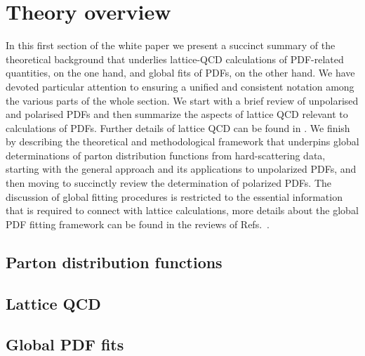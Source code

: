 
\section{Theory overview}
\label{sec:theoryoverview}

In this first section of the white paper we present a succinct
summary of the theoretical background that underlies
lattice-QCD calculations of PDF-related
quantities, on the one hand, and global fits
of PDFs, on the other hand.
%
We have devoted particular attention to ensuring a unified and
consistent notation among the various parts of the whole section. We start with a brief
review of unpolarised and polarised PDFs and then summarize the aspects of lattice
QCD relevant to calculations of PDFs. Further details of lattice QCD can be found in
\cite{???}. We finish by describing the theoretical and methodological framework that underpins global
determinations of parton distribution functions from hard-scattering data, starting with
the general approach and its applications to unpolarized PDFs, and then
moving to succinctly review the determination of polarized PDFs.
%
The discussion of global fitting procedures is restricted to the essential information that is required to connect
with lattice calculations, more details about the
global PDF fitting framework can be found in the reviews of
Refs.~\cite{Ball:2012wy,Forte:2013wc,Rojo:2015acz,Butterworth:2015oua}.

\subsection{Parton distribution functions}
\label{Sec:IntroLQCD}



\subsection{Lattice QCD}
\label{Sec:IntroLQCD}



\subsection{Global PDF fits}





